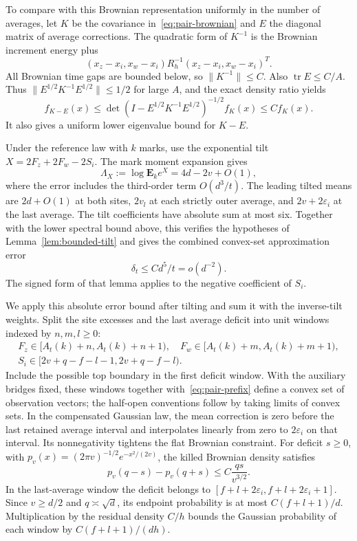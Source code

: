 \documentclass[11pt,a4paper]{article}
\numberwithin{equation}{section}
\theoremstyle{remark}
\begin{document}
To compare with this Brownian representation uniformly in the number of averages, let $K$ be the covariance in~\eqref{eq:pair-brownian} and $E$ the diagonal matrix of average corrections. The quadratic form of $K^{-1}$ is the Brownian increment energy plus
\[
 (x_z-x_i,x_w-x_i)R_h^{-1}(x_z-x_i,x_w-x_i)^T.
\]
All Brownian time gaps are bounded below, so $\|K^{-1}\|\le C$. Also $\operatorname{tr}E\le C/A$. Thus $\|E^{1/2}K^{-1}E^{1/2}\|\le1/2$ for large $A$, and the exact density ratio yields
\begin{equation}\label{eq:pair-density}
 f_{K-E}(x)\le\det(I-E^{1/2}K^{-1}E^{1/2})^{-1/2}f_K(x)
 \le C f_K(x).
\end{equation}
It also gives a uniform lower eigenvalue bound for $K-E$.

Under the reference law with $k$ marks, use the exponential tilt $X=2F_z+2F_w-2S_i$. The mark moment expansion gives
\begin{equation}\label{eq:9.2}
 \Lambda_X:=\log\mathbf E_ke^X=4d-2v+O(1),
\end{equation}
where the error includes the third-order term $O(d^3/t)$. The leading tilted means are $2d+O(1)$ at both sites, $2v_l$ at each strictly outer average, and $2v+2\varepsilon_i$ at the last average. The tilt coefficients have absolute sum at most six. Together with the lower spectral bound above, this verifies the hypotheses of Lemma~\ref{lem:bounded-tilt} and gives the combined convex-set approximation error
\begin{equation}\label{eq:pair-clt}
 \delta_t\le Cd^5/t=o(d^{-2}).
\end{equation}
The signed form of that lemma applies to the negative coefficient of $S_i$.

We apply this absolute error bound after tilting and sum it with the inverse-tilt weights. Split the site excesses and the last average deficit into unit windows indexed by $n,m,l\ge0$:
\begin{equation}\label{eq:pair-windows}
\begin{gathered}
 F_z\in[A_t(k)+n,A_t(k)+n+1),\quad
 F_w\in[A_t(k)+m,A_t(k)+m+1),\\
 S_i\in[2v+q-f-l-1,2v+q-f-l).
\end{gathered}
\end{equation}
Include the possible top boundary in the first deficit window. With the auxiliary bridges fixed, these windows together with~\eqref{eq:pair-prefix} define a convex set of observation vectors; the half-open conventions follow by taking limits of convex sets. In the compensated Gaussian law, the mean correction is zero before the last retained average interval and interpolates linearly from zero to $2\varepsilon_i$ on that interval. Its nonnegativity tightens the flat Brownian constraint. For deficit $s\ge0$, with $p_v(x)=(2\pi v)^{-1/2}e^{-x^2/(2v)}$, the killed Brownian density satisfies
\[
 p_v(q-s)-p_v(q+s)\le C\frac{qs}{v^{3/2}}.
\]
In the last-average window the deficit belongs to
$[f+l+2\varepsilon_i,f+l+2\varepsilon_i+1]$. Since $v\ge d/2$ and $q\asymp\sqrt d$, its endpoint probability is at most $C(f+l+1)/d$.
Multiplication by the residual density $C/h$ bounds the Gaussian probability of each window by $C(f+l+1)/(dh)$.
\end{document}
